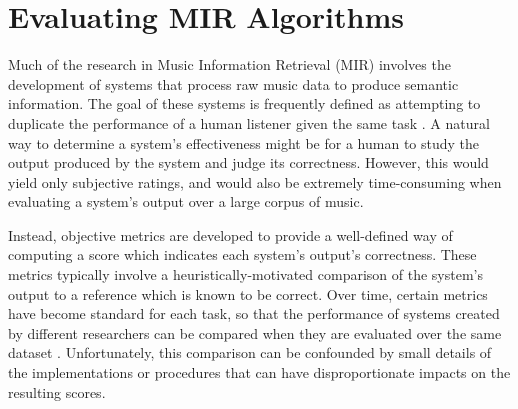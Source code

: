 \documentclass{article}
\title{\mireval{}}
\def\mireval{\texttt{mir\char`_eval}}
\begin{document}
%
\maketitle
%
\begin{abstract}
Central to the field of MIR research is the evaluation of algorithms used to extract information from music data.
We present \mireval{}, an open source software library which provides a transparent and easy-to-use implementation of the most common metrics used to measure the performance of MIR algorithms.
In this paper, we enumerate the metrics implemented by \mireval{} and quantitatively compare each to  existing implementations.
When the scores reported by \mireval{} differ substantially from the reference, we detail the differences in implementation.
We also provide a brief overview of \mireval{}'s architecture, design, and intended use.
\end{abstract}
%
\section{Evaluating MIR Algorithms}

Much of the research in Music Information Retrieval (MIR) involves the development of systems that process raw music data to produce semantic information.
The goal of these systems is frequently defined as attempting to duplicate the performance of a human listener given the same task \cite{downie2003toward}.
A natural way to determine a system's effectiveness might be for a human to study the output produced by the system and judge its correctness.
However, this would yield only subjective ratings, and would also be extremely time-consuming when evaluating a system's output over a large corpus of music.

Instead, objective metrics are developed to provide a well-defined way of computing a score which indicates each system's output's correctness.
These metrics typically involve a heuristically-motivated comparison of the system's output to a reference which is known to be correct.
Over time, certain metrics have become standard for each task, so that the performance of systems created by different researchers can be compared when they are evaluated over the same dataset \cite{downie2003toward}.
Unfortunately, this comparison can be confounded by small details of the implementations or procedures that can have disproportionate impacts on the resulting scores.
\end{document}
